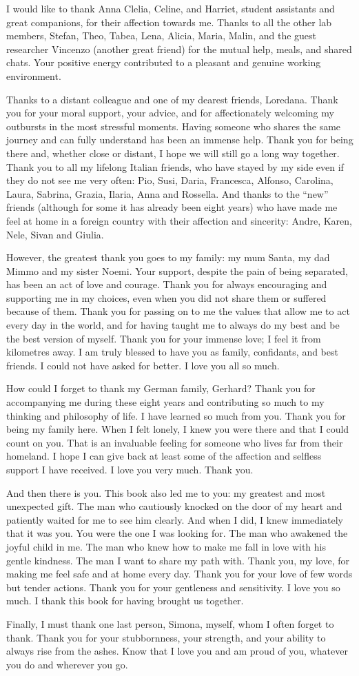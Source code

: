 I would like to thank Anna Clelia, Celine, and Harriet, student assistants and great companions, for their affection towards me. Thanks to all the other lab members, Stefan, Theo, Tabea, Lena, Alicia, Maria, Malin, and the guest researcher Vincenzo (another great friend) for the mutual help, meals, and shared chats. Your positive energy contributed to a pleasant and genuine working environment.

Thanks to a distant colleague and one of my dearest friends, Loredana. Thank you for your moral support, your advice, and for affectionately welcoming my outbursts in the most stressful moments. Having someone who shares the same journey and can fully understand has been an immense help. Thank you for being there and, whether close or distant, I hope we will still go a long way together.
Thank you to all my lifelong Italian friends, who have stayed by my side even if they do not see me very often: Pio, Susi, Daria, Francesca, Alfonso, Carolina, Laura, Sabrina, Grazia, Ilaria, Anna and Rossella. And thanks to the “new” friends (although for some it has already been eight years) who have made me feel at home in a foreign country with their affection and sincerity: Andre, Karen, Nele, Sivan and Giulia.

However, the greatest thank you goes to my family: my mum Santa, my dad Mimmo and my sister Noemi. Your support, despite the pain of being separated, has been an act of love and courage. Thank you for always encouraging and supporting me in my choices, even when you did not share them or suffered because of them. Thank you for passing on to me the values that allow me to act every day in the world, and for having taught me to always do my best and be the best version of myself. Thank you for your immense love; I feel it from kilometres away. I am truly blessed to have you as family, confidants, and best friends. I could not have asked for better. I love you all so much.

How could I forget to thank my German family, Gerhard? Thank you for accompanying me during these eight years and contributing so much to my thinking and philosophy of life. I have learned so much from you. Thank you for being my family here. When I felt lonely, I knew you were there and that I could count on you. That is an invaluable feeling for someone who lives far from their homeland. I hope I can give back at least some of the affection and selfless support I have received. I love you very much. Thank you.

And then there is you. This book also led me to you: my greatest and most unexpected gift. The man who cautiously knocked on the door of my heart and patiently waited for me to see him clearly. And when I did, I knew immediately that it was you. You were the one I was looking for. The man who awakened the joyful child in me. The man who knew how to make me fall in love with his gentle kindness. The man I want to share my path with. Thank you, my love, for making me feel safe and at home every day. Thank you for your love of few words but tender actions. Thank you for your gentleness and sensitivity. I love you so much. I thank this book for having brought us together.

Finally, I must thank one last person, Simona, myself, whom I often forget to thank. Thank you for your stubbornness, your strength, and your ability to always rise from the ashes. Know that I love you and am proud of you, whatever you do and wherever you go.